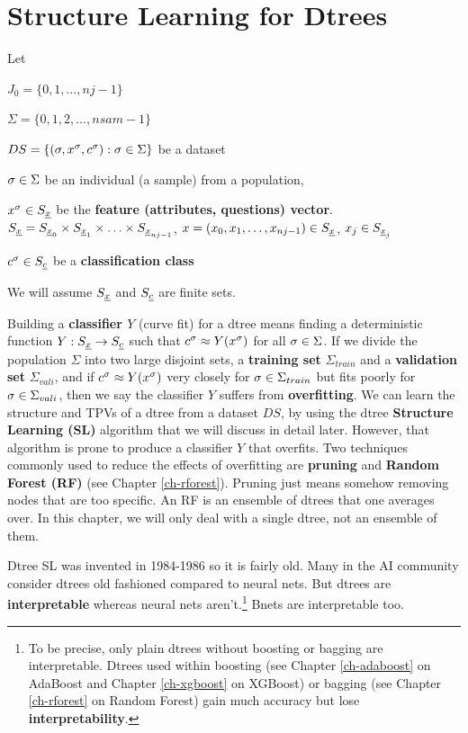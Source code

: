\section{Structure Learning for  Dtrees}\label{sec-dtree-sl}



Let

$J_0=\{0,1, \ldots, nj-1\}$

$\Sigma=\{0,1,2, \ldots,nsam-1\}$

$DS=\{(\sigma, x^\sigma, c^\sigma): \sigma\in \Sigma\}$ be a dataset

$\sigma\in \Sigma$ be an individual (a sample)
from a population, 

$x^\s\in S_\rvx$ be the {\bf
feature (attributes, questions) vector}.
$S_\rvx= S_{\rvx_0}\times S_{\rvx_1}
\times\ldots\times S_{\rvx_{nj-1}}$,
$x=(x_0, x_1, \ldots, x_{nj-1})\in S_\rvx$, 
$x_j\in S_{\rvx_j}$


$c^\s\in S_\rvc$ be a {\bf classification class}

We will
assume $S_\rvx$ and $S_\rvc$ are finite sets.

Building a {\bf classifier $Y$} 
(curve fit) for a dtree means
finding a deterministic
function $Y:S_\rvx\rarrow S_\rvc$ 
such that 
$c^\sigma \approx Y(x^\sigma)$
for all $\sigma\in \Sigma$.
If we divide
the population
$\Sigma$ 
into two large 
disjoint
sets, a {\bf training set} $\Sigma_{train}$
and a {\bf validation set} $\Sigma_{vali}$,
and if $c^\sigma \approx Y(x^\sigma)$ very closely
for $\sigma\in \Sigma_{train}$
but fits poorly
for $\sigma\in \Sigma_{vali}$,
then we say the classifier  $Y$
suffers from {\bf overfitting}.
We can learn the structure
and TPVs of a dtree from a dataset $DS$,
by using the
dtree {\bf Structure Learning (SL)}
algorithm that we will 
discuss in detail later. However,
that algorithm
is prone to produce
a classifier $Y$ that overfits.
Two techniques 
commonly used to 
reduce the effects of overfitting
are {\bf pruning}  and 
{\bf Random Forest (RF)}
(see Chapter \ref{ch-rforest}).
Pruning just means somehow
removing nodes that are
too specific. 
An RF is an ensemble of dtrees 
that one averages over.
In this chapter, we will only deal
with a single dtree,
not an ensemble of them. 

Dtree SL was invented in 1984-1986 so it
is fairly old.
Many in the AI
community 
consider dtrees old fashioned
compared to neural nets.
But dtrees 
are {\bf interpretable} whereas neural nets aren't.\footnote{
To be precise, only
plain dtrees without boosting or
 bagging
are interpretable.
Dtrees used within boosting
(see Chapter \ref{ch-adaboost} on AdaBoost
and
Chapter \ref{ch-xgboost} on XGBoost)
or bagging
(see Chapter \ref{ch-rforest} on Random Forest)
gain much
accuracy but lose
{\bf interpretability}.}
Bnets are interpretable too.


